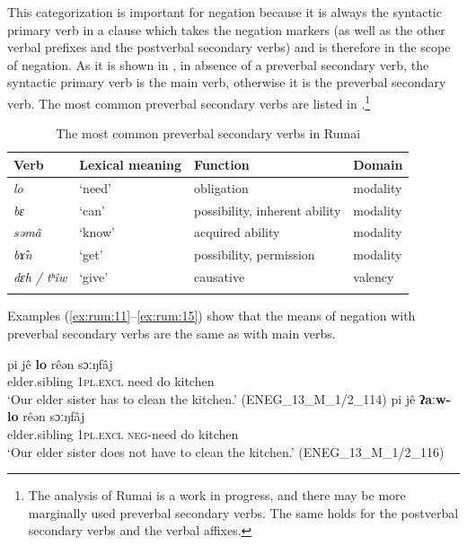 \documentclass[output=paper,colorlinks,citecolor=brown]{langscibook}
\begin{document}
This categorization is important for negation because it is always the syntactic primary verb in a clause which takes the negation markers (as well as the other verbal prefixes and the postverbal secondary verbs) and is therefore in the scope of negation. As it is shown in , in absence of a preverbal secondary verb, the syntactic primary verb is the main verb, otherwise it is the preverbal secondary verb. The most common preverbal secondary verbs are listed in .\footnote{The analysis of Rumai is a work in progress, and there may be more marginally used preverbal secondary verbs. The same holds for the postverbal secondary verbs and the verbal affixes.}

\begin{table}
\begin{tabularx}{.9\textwidth}{llll}
\lsptoprule
{Verb} & {Lexical meaning} & {Function} & {Domain}\\
\midrule 
{\itshape lo} & {‘need’} & {obligation} & {modality}\\
{\itshape bɛ} & {‘can’} & {possibility, inherent ability} & {modality}\\
{\itshape səmâ} & {‘know’} & {acquired ability} & {modality}\\
{\textit{bɤ̂n}} & {‘get’} & {possibility, permission} & {modality}\\
{\textit{dɛh / tʰîw}} & {‘give’} & {causative} & {valency}\\
\lspbottomrule
\end{tabularx}
\caption{The most common preverbal secondary verbs in Rumai}
\label{tab:rum:2}
\end{table}

Examples (\ref{ex:rum:11}--\ref{ex:rum:15}) show that the means of negation with preverbal secondary verbs are the same as with main verbs.

\ea\label{ex:rum:11}
    \ea\label{ex:rum:11a}
        \gll pi	jê	\textbf{lo}	rêən	sɔːŋfâj \\ 
             elder.sibling \textsc{1pl.excl} need do kitchen \\
        \glt ‘Our elder sister has to clean the kitchen.’ (ENEG\_13\_M\_1/2\_114)
    \ex\label{ex:rum:11b}
        \gll pi	jê	\textbf{ʔaːw-lo}	rêən	sɔːŋfâj \\
             elder.sibling \textsc{1pl.excl} \textsc{neg}{}-need do kitchen \\
        \glt ‘Our elder sister does not have to clean the kitchen.’ (ENEG\_13\_M\_1/2\_116)
    \z
\z 
\end{document}
